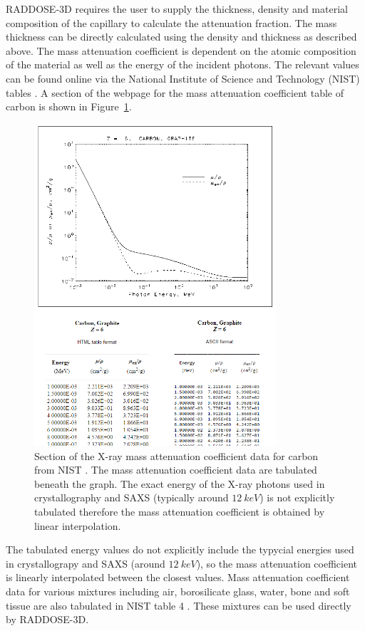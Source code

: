 RADDOSE-3D requires the user to supply the thickness, density and material composition of the capillary to calculate the attenuation fraction.
The mass thickness can be directly calculated using the density and thickness as described above.
The mass attenuation coefficient is dependent on the atomic composition of the material as well as the energy of the incident photons.
The relevant values can be found online via the National Institute of Science and Technology (NIST) tables \cite{nisttable3,nisttable4}.
A section of the webpage for the mass attenuation coefficient table of carbon is shown in Figure~\ref{fig:NIST table for carbon}.
\begin{figure}
    \centering
    \includegraphics[width=0.8\textwidth]{figures/saxs/nist_table_carbon.png}
    \caption[X-ray mass attenuation coefficient data for carbon from NIST.]{Section of the X-ray mass attenuation coefficient data for carbon from NIST \cite{nisttable3}. The mass attenuation coefficient data are tabulated beneath the graph. The exact energy of the X-ray photons used in crystallography and SAXS (typically around $12\ keV$) is not explicitly tabulated therefore the mass attenuation coefficient is obtained by linear interpolation.}
    \label{fig:NIST table for carbon}
\end{figure}
The tabulated energy values do not explicitly include the typycial energies used in crystallograpy and SAXS (around $12\ keV$), so the mass attenuation coefficient is linearly interpolated between the closest values.
Mass attenuation coefficient data for various mixtures including air, borosilicate glass, water, bone and soft tissue are also tabulated in NIST table 4 \cite{nisttable4}.
These mixtures can be used directly by RADDOSE-3D.


